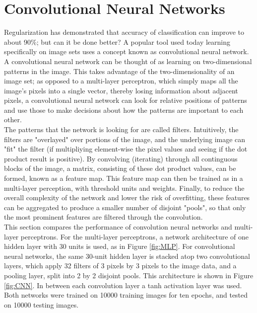 \documentclass{article}
\begin{document}
\section{Convolutional Neural Networks}
Regularization has demonstrated that accuracy of classification can improve to about 90\%; but can it be done better? A popular tool used today learning specifically on image sets uses a concept known as convolutional neural network. A convolutional neural network can be thought of as learning on two-dimensional patterns in the image. This takes advantage of the two-dimensionality of an image set; as opposed to a multi-layer perceptron, which simply maps all the image's pixels into a single vector, thereby losing information about adjacent pixels, a convolutional neural network can look for relative positions of patterns and use those to make decisions about how the patterns are important to each other. \\
The patterns that the network is looking for are called filters. Intuitively, the filters are "overlayed" over portions of the image, and the underlying image can "fit" the filter (if multipliying element-wise the pixel values and seeing if the dot product result is positive). By convolving (iterating) through all continguous blocks of the image, a matrix, consisting of these dot product values, can be formed, known as a feature map. This feature map can then be trained as in a multi-layer perception, with threshold units and weights. Finally, to reduce the overall complexity of the network and lower the risk of overfitting, these features can be aggregated to produce a smaller number of disjoint "pools", so that only the most prominent features are filtered through the convolution.\\

This section compares the performance of convolution neural networks and multi-layer perceptrons. For the multi-layer perceptrons, a network architecture of one hidden layer with 30 units is used, as in Figure \ref{fig:MLP}. For convolutional neural networks, the same 30-unit hidden layer is stacked atop two convolutional layers, which apply 32 filters of 3 pixels by 3 pixels to the image data, and a pooling layer, split into 2 by 2 disjoint pools. This architecture is shown in Figure \ref{fig:CNN}. In between each convolution layer a tanh activation layer was used. Both networks were trained on 10000 training images for ten epochs, and tested on 10000 testing images.
\end{document}
